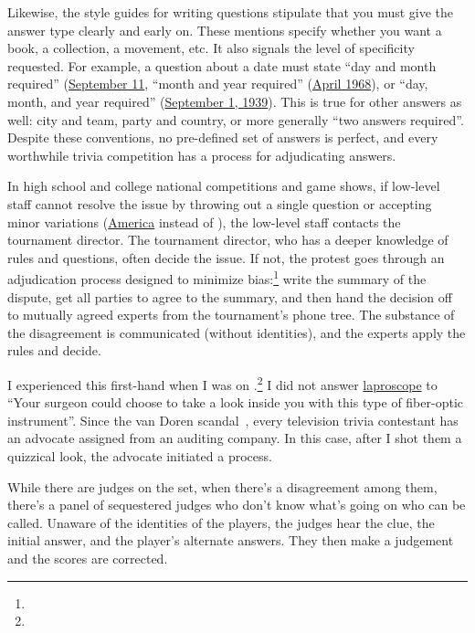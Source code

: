 Likewise, the style guides for writing questions stipulate that you
must give the answer type clearly and early on.
These mentions specify whether you want a book, a collection, a movement, etc.
It also signals the level of specificity requested.
For example, a question about a date must state ``day and month required'' (\underline{September 11}, ``month and year required'' (\underline{April 1968}), or ``day, month, and year required'' (\underline{September 1, 1939}).
This is true for other answers as well: city and team, party and
country, or more generally ``two answers required''.
Despite these conventions, no pre-defined set of answers is perfect,
and every worthwhile trivia competition has a process for adjudicating
answers.

In high school and college national competitions and game shows,
if low-level staff cannot resolve the issue by throwing out a single
question or accepting minor variations (\underline{America} instead of
\underline{}), the low-level staff contacts the tournament
director.
The tournament director, who has a deeper knowledge of rules and questions, often decide the issue.
If not, the protest goes
through an adjudication process designed to minimize
bias:\footnote{}
write the summary of the dispute,
get all parties to agree to the summary,
and then hand the decision off to mutually agreed experts from the tournament's phone tree.
The substance of the disagreement is communicated (without identities), and the experts apply the rules and decide.

I experienced this first-hand when I was on \jeopardyp{}.\footnote{} I did not answer \underline{laproscope} to ``Your surgeon could choose to take a look inside you with this type of fiber-optic instrument''.
Since the van Doren scandal~\cite{freedman-97}, every television trivia contestant has an advocate assigned from an
auditing company.
%
In this case, after I shot them a quizzical look, the advocate initiated a process.

While there are judges on the set, when there's a disagreement among them, there's a panel of sequestered judges who don't know what's going on who can be called.
%
Unaware of the identities of the players, the judges hear the clue, the initial answer, and the player's alternate answers.
%
They then make a judgement and the scores are corrected.

